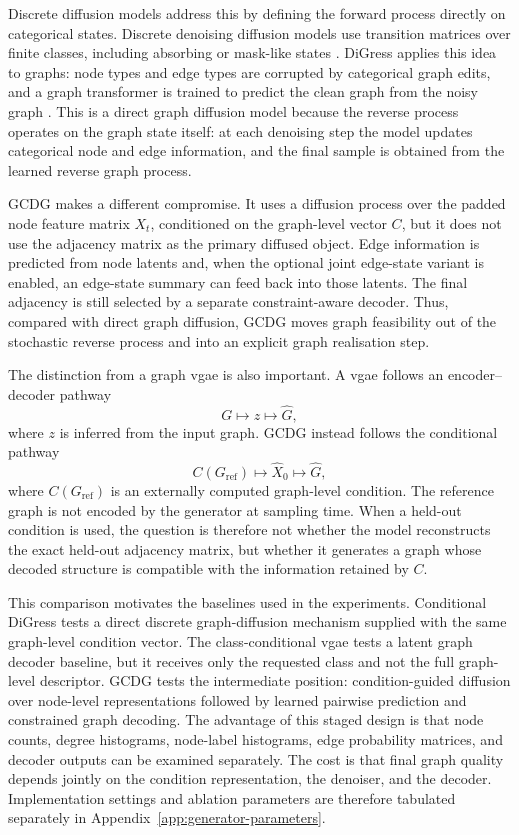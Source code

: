 Discrete diffusion models address this by defining the forward process directly
on categorical states. Discrete denoising diffusion models use transition
matrices over finite classes, including absorbing or mask-like states
\citep{austin2021structured}. DiGress applies this idea to graphs: node types
and edge types are corrupted by categorical graph edits, and a graph transformer
is trained to predict the clean graph from the noisy graph
\citep{vignac2022digress}. This is a direct graph diffusion model because the
reverse process operates on the graph state itself: at each denoising step the
model updates categorical node and edge information, and the final sample is
obtained from the learned reverse graph process.

GCDG makes a different compromise. It uses a diffusion process over the padded
node feature matrix \(X_t\), conditioned on the graph-level vector \(C\), but it
does not use the adjacency matrix as the primary diffused object. Edge
information is predicted from node latents and, when the optional joint
edge-state variant is enabled, an edge-state summary can feed back into those
latents. The final adjacency is still selected by a separate constraint-aware
decoder. Thus, compared with direct graph diffusion, GCDG moves graph
feasibility out of the stochastic reverse process and into an explicit graph
realisation step.

The distinction from a graph \gls{vgae} is also important. A \gls{vgae} follows
an encoder--decoder pathway
\[
    G \mapsto z \mapsto \hat G,
\]
where \(z\) is inferred from the input graph. GCDG instead follows the
conditional pathway
\[
    C(G_{\mathrm{ref}}) \mapsto \hat X_0 \mapsto \hat G,
\]
where \(C(G_{\mathrm{ref}})\) is an externally computed graph-level condition.
The reference graph is not encoded by the generator at sampling time. When a
held-out condition is used, the question is therefore not whether the model
reconstructs the exact held-out adjacency matrix, but whether it generates a
graph whose decoded structure is compatible with the information retained by
\(C\).

This comparison motivates the baselines used in the experiments. Conditional
DiGress tests a direct discrete graph-diffusion mechanism supplied with the
same graph-level condition vector. The class-conditional \gls{vgae} tests a
latent graph decoder baseline, but it receives only the requested class and not
the full graph-level descriptor. GCDG tests the intermediate position:
condition-guided diffusion over node-level representations followed by learned
pairwise prediction and constrained graph decoding. The advantage of this
staged design is that node counts, degree histograms, node-label histograms,
edge probability matrices, and decoder outputs can be examined separately. The
cost is that final graph quality depends jointly on the condition
representation, the denoiser, and the decoder. Implementation settings and
ablation parameters are therefore tabulated separately in
Appendix~\ref{app:generator-parameters}.

